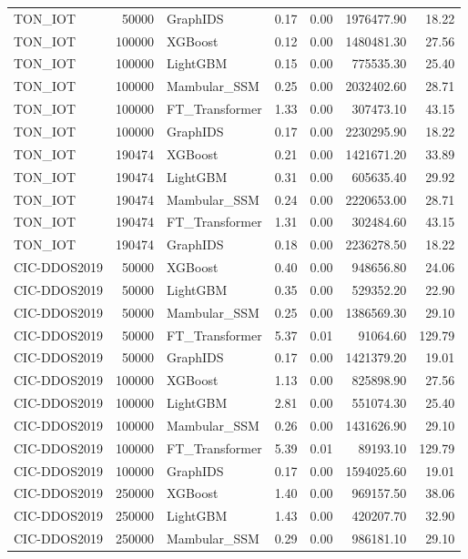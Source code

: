 \begin{table}[t]
\begin{tabular}{lrlrrrr}
TON_IOT & 50000 & GraphIDS & 0.17 & 0.00 & 1976477.90 & 18.22 \\
TON_IOT & 100000 & XGBoost & 0.12 & 0.00 & 1480481.30 & 27.56 \\
TON_IOT & 100000 & LightGBM & 0.15 & 0.00 & 775535.30 & 25.40 \\
TON_IOT & 100000 & Mambular_SSM & 0.25 & 0.00 & 2032402.60 & 28.71 \\
TON_IOT & 100000 & FT_Transformer & 1.33 & 0.00 & 307473.10 & 43.15 \\
TON_IOT & 100000 & GraphIDS & 0.17 & 0.00 & 2230295.90 & 18.22 \\
TON_IOT & 190474 & XGBoost & 0.21 & 0.00 & 1421671.20 & 33.89 \\
TON_IOT & 190474 & LightGBM & 0.31 & 0.00 & 605635.40 & 29.92 \\
TON_IOT & 190474 & Mambular_SSM & 0.24 & 0.00 & 2220653.00 & 28.71 \\
TON_IOT & 190474 & FT_Transformer & 1.31 & 0.00 & 302484.60 & 43.15 \\
TON_IOT & 190474 & GraphIDS & 0.18 & 0.00 & 2236278.50 & 18.22 \\
CIC-DDOS2019 & 50000 & XGBoost & 0.40 & 0.00 & 948656.80 & 24.06 \\
CIC-DDOS2019 & 50000 & LightGBM & 0.35 & 0.00 & 529352.20 & 22.90 \\
CIC-DDOS2019 & 50000 & Mambular_SSM & 0.25 & 0.00 & 1386569.30 & 29.10 \\
CIC-DDOS2019 & 50000 & FT_Transformer & 5.37 & 0.01 & 91064.60 & 129.79 \\
CIC-DDOS2019 & 50000 & GraphIDS & 0.17 & 0.00 & 1421379.20 & 19.01 \\
CIC-DDOS2019 & 100000 & XGBoost & 1.13 & 0.00 & 825898.90 & 27.56 \\
CIC-DDOS2019 & 100000 & LightGBM & 2.81 & 0.00 & 551074.30 & 25.40 \\
CIC-DDOS2019 & 100000 & Mambular_SSM & 0.26 & 0.00 & 1431626.90 & 29.10 \\
CIC-DDOS2019 & 100000 & FT_Transformer & 5.39 & 0.01 & 89193.10 & 129.79 \\
CIC-DDOS2019 & 100000 & GraphIDS & 0.17 & 0.00 & 1594025.60 & 19.01 \\
CIC-DDOS2019 & 250000 & XGBoost & 1.40 & 0.00 & 969157.50 & 38.06 \\
CIC-DDOS2019 & 250000 & LightGBM & 1.43 & 0.00 & 420207.70 & 32.90 \\
CIC-DDOS2019 & 250000 & Mambular_SSM & 0.29 & 0.00 & 986181.10 & 29.10 \\

\end{tabular}
\end{table}
